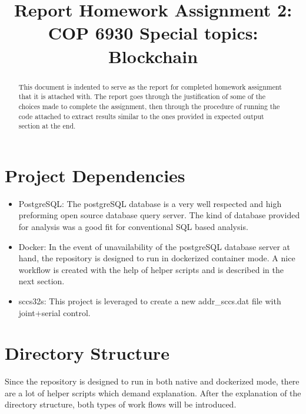 \documentclass[conference,a4paper,12pt]{IEEEtran}
\begin{document}
\title{Report Homework Assignment 2: COP 6930 Special topics: Blockchain}

\author{
}

\maketitle

\begin{abstract}
This document is indented to serve as the report for completed homework assignment that it is attached with. The report goes through the justification of some of the choices made to complete the assignment, then through the procedure of running the code attached to extract results similar to the ones provided in expected output section at the end.
\end{abstract}

\section{Project Dependencies}
	\begin{itemize}
		\item{PostgreSQL:}
		The postgreSQL database is a very well respected and high preforming open source database query server. The kind of database provided for analysis was a good fit for conventional SQL based analysis.
		\item{Docker:}
		In the event of unavailability of the postgreSQL database server at hand, the repository is designed to run in dockerized container mode. A nice workflow is created with the help of helper scripts and is described in the next section.
		\item{sccs32s:}
		This project is leveraged to create a new addr\_sccs.dat file with joint+serial control.
	\end{itemize}


\section{Directory Structure}
	Since the repository is designed to run in both native and dockerized mode, there are a lot of helper scripts which demand explanation. After the explanation of the directory structure, both types of work flows will be introduced.
\end{document}
